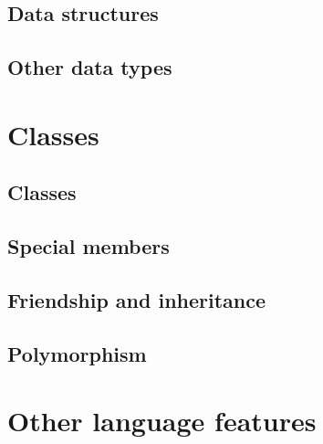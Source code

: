 \documentclass{beamer}
\begin{document}
\subsection{Data structures}
\begin{frame}

\end{frame}

\subsection{Other data types}
\begin{frame}

\end{frame}


\section{Classes}
\subsection{Classes}
\begin{frame}

\end{frame}

\subsection{Special members}
\begin{frame}

\end{frame}

\subsection{Friendship and inheritance}
\begin{frame}

\end{frame}

\subsection{Polymorphism}
\begin{frame}

\end{frame}


\section{Other language features}
\end{document}
